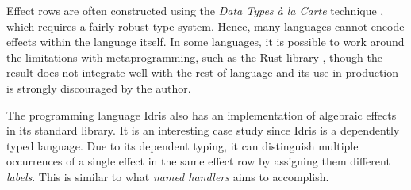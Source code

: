 Effect rows are often constructed using the \emph{Data Types à la Carte} technique \autocite{swierstra_data_2008}, which requires a fairly robust type system. Hence, many languages cannot encode effects within the language itself. In some languages, it is possible to work around the limitations with metaprogramming, such as the Rust library , though the result does not integrate well with the rest of language and its use in production is strongly discouraged by the author.

The programming language Idris \autocite{brady_programming_2013} also has an implementation of algebraic effects in its standard library. It is an interesting case study since Idris is a dependently typed language. Due to its dependent typing, it can distinguish multiple occurrences of a single effect in the same effect row by assigning them different \emph{labels}. This is similar to what \emph{named handlers} \autocite{xie_first-class_2022} aims to accomplish.
